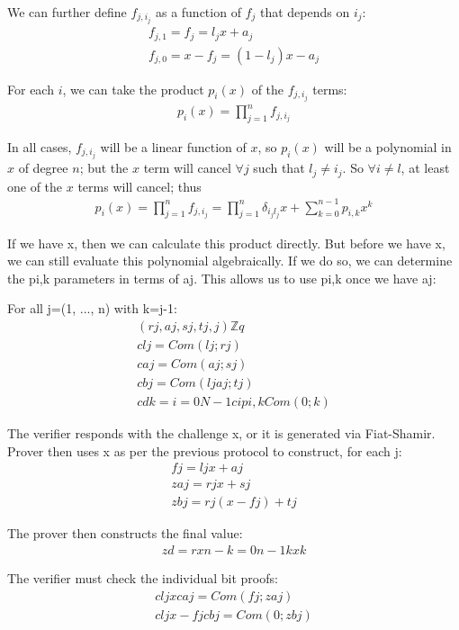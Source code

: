 \documentclass{article}
\begin{document}
We can further define $f_{j, i_j}$ as a function of $f_j$ that depends on $i_j$:
\begin{eqnarray}
  f_{j,1} = f_j = l_j x + a_j\\
  f_{j,0} = x - f_j = (1 - l_j) x - a_j
\end{eqnarray}

For each $i$, we can take the product $p_i(x)$ of the $f_{j, i_j}$ terms:
\begin{eqnarray}
  p_i(x) = \prod_{j=1}^{n} f_{j, i_j}
\end{eqnarray}

In all cases, $f_{j, i_j}$ will be a linear function of $x$, so $p_i(x)$ will be a polynomial in $x$ of degree $n$; but the $x$ term will cancel $\forall j$ such that $l_j \ne i_j$.  So $\forall i \ne l$, at least one of the $x$ terms will cancel; thus
\begin{eqnarray}
  p_i(x) = \prod_{j=1}^n f_{j,i_j} = {\prod_{j=1}^{n}\delta_{i_jl_j} x} + \sum_{k=0}^{n-1}{p_{i,k} x^k}
\end{eqnarray}

If we have x, then we can calculate this product directly.  But before we have x, we can still evaluate this polynomial algebraically.  If we do so, we can determine the pi,k parameters in terms of aj.  This allows us to use pi,k once we have aj:

For all j=(1, ..., n) with k=j-1:
\begin{eqnarray}
  (rj,aj,sj,tj,j) \mathbb{Z}q\\
  clj=Com(lj;rj)\\
  caj=Com(aj;sj)\\
  cbj=Com(ljaj;tj)\\
  cdk=i=0N-1cipi,k Com(0;k)
\end{eqnarray}

The verifier responds with the challenge x, or it is generated via Fiat-Shamir.  Prover then uses x as per the previous protocol to construct, for each j:
\begin{eqnarray}
  fj=ljx+aj\\
  zaj=rjx+sj\\
  zbj=rj(x-fj)+tj
\end{eqnarray}

The prover then constructs the final value:
\begin{eqnarray}
  zd=rxn-k=0n-1kxk
\end{eqnarray}

The verifier must check the individual bit proofs:
\begin{eqnarray}
  cljx caj=Com(fj;zaj)\\
  cljx-fjcbj=Com(0;zbj)
\end{eqnarray}
    
\end{document}
